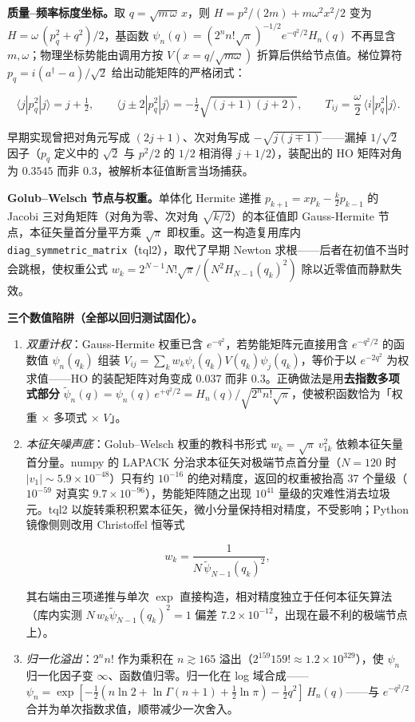 \documentclass[
]{ctexbook}
\begin{document}
\textbf{质量--频率标度坐标。}取 \(q=\sqrt{m\,\omega}\,x\)，则
\(H=p^2/(2m)+m\omega^2x^2/2\) 变为 \(H=\omega\,(p_q^2+q^2)/2\)，基函数
\(\psi_n(q)=(2^n n!\sqrt{\pi})^{-1/2}e^{-q^2/2}H_n(q)\) 不再显含
\(m,\omega\)；物理坐标势能由调用方按 \(V(x=q/\sqrt{m\omega})\)
折算后供给节点值。梯位算符 \(p_q=i(a^\dagger-a)/\sqrt{2}\)
给出动能矩阵的严格闭式：

\[
\langle j|p_q^2|j\rangle=j+\tfrac12,\qquad
\langle j\pm 2|p_q^2|j\rangle=-\tfrac12\sqrt{(j{+}1)(j{+}2)},\qquad
T_{ij}=\frac{\omega}{2}\,\langle i|p_q^2|j\rangle .
\]

早期实现曾把对角元写成 \((2j{+}1)\)、次对角写成
\(-\sqrt{j(j{\mp}1)}\)------漏掉 \(1/\sqrt2\) 因子（\(p_q\) 定义中的
\(\sqrt2\) 与 \(p^2/2\) 的 \(1/2\) 相消得 \(j{+}1/2\)），装配出的 HO
矩阵对角为 \(0.3545\) 而非 \(0.3\)，被解析本征值断言当场捕获。

\textbf{Golub--Welsch 节点与权重。}单体化 Hermite 递推
\(p_{k+1}=xp_k-\tfrac{k}{2}p_{k-1}\) 的 Jacobi
三对角矩阵（对角为零、次对角 \(\sqrt{k/2}\)）的本征值即 Gauss-Hermite
节点，本征矢量首分量平方乘 \(\sqrt{\pi}\) 即权重。这一构造复用库内
\texttt{diag\_symmetric\_matrix}（tql2），取代了早期 Newton
求根------后者在初值不当时会跳根，使权重公式
\(w_k=2^{N-1}N!\sqrt{\pi}/(N^2H_{N-1}(q_k)^2)\) 除以近零值而静默失效。

\textbf{三个数值陷阱（全部以回归测试固化）。}

\begin{enumerate}
\def\labelenumi{\arabic{enumi}.}
\item
  \emph{双重计权}：Gauss-Hermite 权重已含
  \(e^{-q^2}\)，若势能矩阵元直接用含 \(e^{-q^2/2}\) 的函数值
  \(\psi_n(q_k)\) 组装
  \(V_{ij}=\sum_k w_k\psi_i(q_k)V(q_k)\psi_j(q_k)\)，等价于以
  \(e^{-2q^2}\) 为权求值------HO 的装配矩阵对角变成 \(0.037\) 而非
  \(0.3\)。正确做法是用\textbf{去指数多项式部分}
  \(\tilde\psi_n(q)=\psi_n(q)\,e^{+q^2/2}=H_n(q)/\sqrt{2^nn!\sqrt{\pi}}\)，使被积函数恰为「权重
  \(\times\) 多项式 \(\times\) \(V\)」。
\item
  \emph{本征矢噪声底}：Golub--Welsch 权重的教科书形式
  \(w_k=\sqrt{\pi}\,v_{1k}^2\) 依赖本征矢量首分量。numpy 的 LAPACK
  分治求本征矢对极端节点首分量（\(N=120\) 时
  \(|v_{1}|\sim5.9\times10^{-48}\)）只有约 \(10^{-16}\)
  的绝对精度，返回的权重被抬高 37 个量级（\(10^{-59}\) 对真实
  \(9.7\times10^{-96}\)），势能矩阵随之出现 \(10^{41}\)
  量级的灾难性消去垃圾元。tql2
  以旋转乘积积累本征矢，微小分量保持相对精度，不受影响；Python
  镜像侧则改用 Christoffel 恒等式

  \[
  w_k=\frac{1}{N\,\tilde\psi_{N-1}(q_k)^2},
  \]

  其右端由三项递推与单次 \(\exp\)
  直接构造，相对精度独立于任何本征矢算法（库内实测
  \(N\,w_k\tilde\psi_{N-1}(q_k)^2=1\) 偏差
  \(7.2\times10^{-12}\)，出现在最不利的极端节点上）。
\item
  \emph{归一化溢出}：\(2^nn!\) 作为乘积在 \(n\gtrsim165\)
  溢出（\(2^{159}159!\approx1.2\times10^{329}\)），使 \(\psi_n\)
  归一化因子变 \(\infty\)、函数值归零。归一化在 log
  域合成------\(\psi_n=\exp[-\tfrac12(n\ln2+\ln\Gamma(n{+}1)+\tfrac12\ln\pi)-\tfrac12q^2]\,H_n(q)\)------与
  \(e^{-q^2/2}\) 合并为单次指数求值，顺带减少一次舍入。
\end{enumerate}
\end{document}
